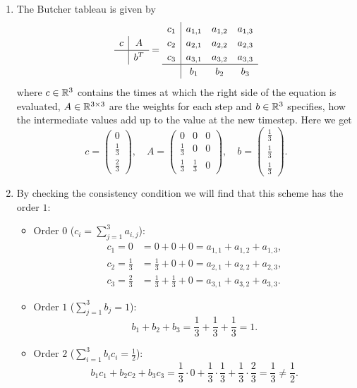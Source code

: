 \documentclass{exercise}
\begin{document}
	\begin{enumerate}
		\item The Butcher tableau is given by
		\[
			\renewcommand\arraystretch{1.2}
			\begin{array}{c|c}
				c & A\\
				\hline
				& b^T
			\end{array} = \begin{array}{c|ccc}
				c_1 & a_{1, 1} & a_{1, 2} & a_{1, 3}\\
				c_2 & a_{2, 1} & a_{2, 2} & a_{2, 3}\\
				c_3 & a_{3, 1} & a_{3, 2} & a_{3, 3}\\
				\hline
				& b_1 & b_2 & b_3
			\end{array}
		\]
		where \(c \in \mathbb{R}^3\) contains the times at which the right side of the equation is evaluated, \(A \in \mathbb{R}^{3 \times 3}\) are the weights for each step and \(b \in \mathbb{R}^3\) specifies, how the intermediate values add up to the value at the new timestep. Here we get
		\[
			c = \begin{pmatrix}
				0\\
				\frac{1}{3}\\
				\frac{2}{3}
			\end{pmatrix}, \quad A = \begin{pmatrix}
				0 & 0 & 0\\
				\frac{1}{3} & 0 & 0\\
				\frac{1}{3} & \frac{1}{3} & 0
			\end{pmatrix}, \quad b = \begin{pmatrix}
				\frac{1}{3}\\
				\frac{1}{3}\\
				\frac{1}{3}
			\end{pmatrix}.
		\]
		\item By checking the consistency condition we will find that this scheme has the order \(1\):
		\begin{itemize}
			\item Order \(0\) (\(c_i = \sum_{j = 1}^3 a_{i, j}\)):
			\begin{align*}
				c_1 = 0 &= 0 + 0 + 0 = a_{1, 1} + a_{1, 2} + a_{1, 3},\\
				c_2 = \frac{1}{3} &= \frac{1}{3} + 0 + 0 = a_{2, 1} + a_{2, 2} + a_{2, 3},\\
				c_3 = \frac{2}{3} &= \frac{1}{3} + \frac{1}{3} + 0 = a_{3, 1} + a_{3, 2} + a_{3, 3}.
			\end{align*}
			\item Order \(1\) (\(\sum_{j = 1}^3 b_j = 1\)):
			\[
				b_1 + b_2 + b_3 = \frac{1}{3} + \frac{1}{3} + \frac{1}{3} = 1.
			\]
			\item Order \(2\) (\(\sum_{i = 1}^3 b_i c_i = \frac{1}{2}\)):
			\[
				b_1 c_1 + b_2 c_2 + b_3 c_3 = \frac{1}{3} \cdot 0 + \frac{1}{3} \cdot \frac{1}{3} + \frac{1}{3} \cdot \frac{2}{3} = \frac{1}{3} \ne \frac{1}{2}.
			\]
		\end{itemize}
	\end{enumerate}
\end{document}
